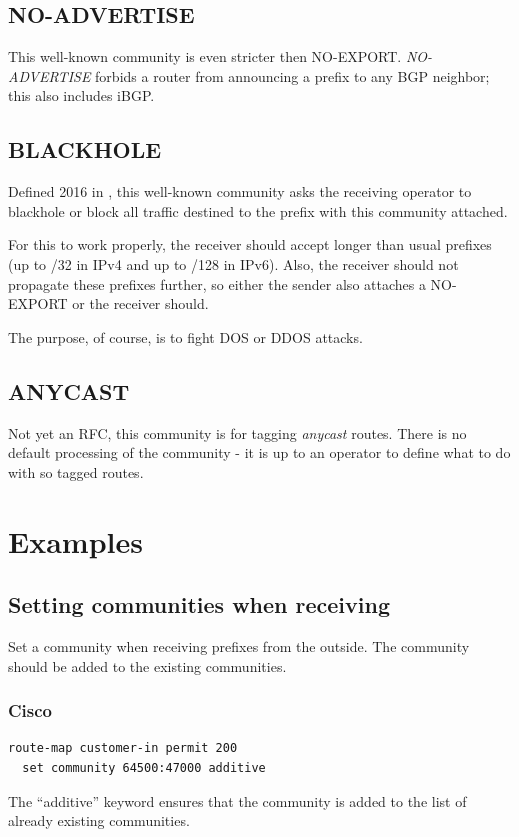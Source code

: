 \subsection{NO-ADVERTISE}
This well-known community is even stricter then NO-EXPORT. \emph{NO-ADVERTISE} forbids a router from announcing a prefix to any BGP neighbor; this also includes iBGP.

\subsection{BLACKHOLE}
Defined 2016 in , this well-known community asks the receiving operator to blackhole or block all traffic destined to the prefix with this community attached.

For this to work properly, the receiver should accept longer than usual prefixes (up to /32 in IPv4 and up to /128 in IPv6). Also, the receiver should not propagate these prefixes further, so either the sender also attaches a NO-EXPORT or the receiver should.

The purpose, of course, is to fight DOS or DDOS attacks.

\subsection{ANYCAST}
Not yet an RFC, this community is for tagging \emph{anycast} routes. There is no default processing of the community - it is up to an operator to define what to do with so tagged routes. 

\section{Examples}
\subsection{Setting communities when receiving}
Set a community when receiving prefixes from the outside. The community should be added to the existing communities.

\subsubsection{Cisco}
\begin{verbatim}
route-map customer-in permit 200
  set community 64500:47000 additive
\end{verbatim}
The ``additive'' keyword ensures that the community is added to the list of already existing communities.

